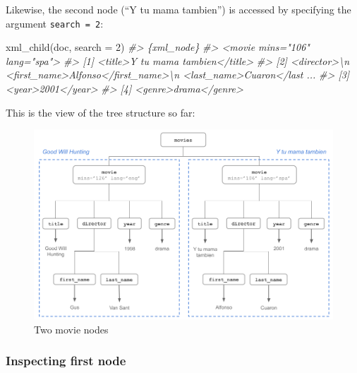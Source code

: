 \documentclass[
]{book}
\newenvironment{Shaded}{\begin{snugshade}}{\end{snugshade}}
\newcommand{\AttributeTok}[1]{\textcolor[rgb]{0.77,0.63,0.00}{#1}}
\newcommand{\CommentTok}[1]{\textcolor[rgb]{0.56,0.35,0.01}{\textit{#1}}}
\newcommand{\DecValTok}[1]{\textcolor[rgb]{0.00,0.00,0.81}{#1}}
\newcommand{\FunctionTok}[1]{\textcolor[rgb]{0.00,0.00,0.00}{#1}}
\newcommand{\NormalTok}[1]{#1}
\begin{document}
Likewise, the second node (``Y tu mama tambien'') is accessed by specifying the
argument \texttt{search\ =\ 2}:

\begin{Shaded}
\begin{Highlighting}[]
\FunctionTok{xml\_child}\NormalTok{(doc, }\AttributeTok{search =} \DecValTok{2}\NormalTok{)}
\CommentTok{\#\textgreater{} \{xml\_node\}}
\CommentTok{\#\textgreater{} \textless{}movie mins="106" lang="spa"\textgreater{}}
\CommentTok{\#\textgreater{} [1] \textless{}title\textgreater{}Y tu mama tambien\textless{}/title\textgreater{}}
\CommentTok{\#\textgreater{} [2] \textless{}director\textgreater{}\textbackslash{}n  \textless{}first\_name\textgreater{}Alfonso\textless{}/first\_name\textgreater{}\textbackslash{}n  \textless{}last\_name\textgreater{}Cuaron\textless{}/last ...}
\CommentTok{\#\textgreater{} [3] \textless{}year\textgreater{}2001\textless{}/year\textgreater{}}
\CommentTok{\#\textgreater{} [4] \textless{}genre\textgreater{}drama\textless{}/genre\textgreater{}}
\end{Highlighting}
\end{Shaded}

This is the view of the tree structure so far:

\begin{figure}

{\centering \includegraphics[width=0.85\linewidth]{images/xml/xml-movies-tree2} 

}

\caption{Two movie nodes}\label{fig:unnamed-chunk-34}
\end{figure}

\hypertarget{inspecting-first-node}{%
\subsubsection*{Inspecting first node}\label{inspecting-first-node}}
\end{document}
